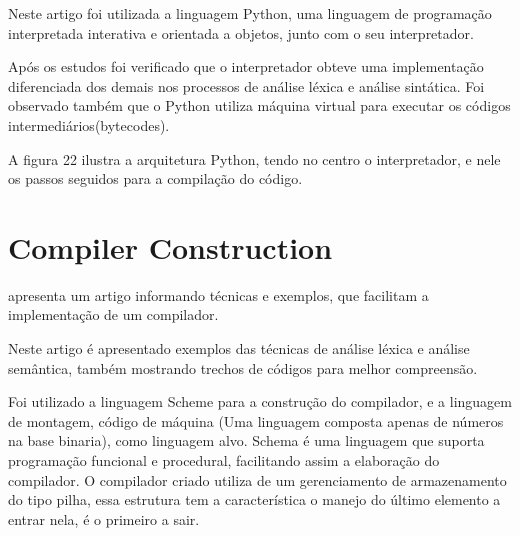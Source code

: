 \documentclass[12pt,oneside,a4paper,chapter=TITLE,section=TITLE,sumario=tradicional]{abntex2}
\begin{document}
Neste artigo foi utilizada a linguagem Python, uma linguagem de programação interpretada interativa e orientada a objetos, junto com o seu interpretador.

Após os estudos foi verificado que o interpretador obteve uma implementação diferenciada dos demais nos processos de análise léxica e análise sintática. Foi observado também que o Python utiliza máquina virtual para executar os códigos intermediários(bytecodes).

A figura 22 ilustra a arquitetura Python, tendo no centro o interpretador, e nele os passos seguidos para a compilação do código.

\begin{figure}[htb]
\end{figure}

\section{ Compiler Construction}
\label{sec:compiler-construction}

\cite{aastha2013} apresenta um artigo informando técnicas e exemplos, que facilitam a implementação de um compilador. 

Neste artigo é apresentado exemplos das técnicas de análise léxica e análise semântica, também mostrando trechos de códigos para melhor compreensão.

Foi utilizado a linguagem Scheme para a construção do compilador, e a linguagem de montagem, código de máquina (Uma linguagem composta apenas de números na base binaria), como linguagem alvo. Schema é uma linguagem que suporta programação funcional e procedural, facilitando assim a elaboração do compilador. O compilador criado utiliza de um gerenciamento de armazenamento do tipo pilha, essa estrutura tem a característica o manejo do último elemento a entrar nela, é o primeiro a sair.
\end{document}
